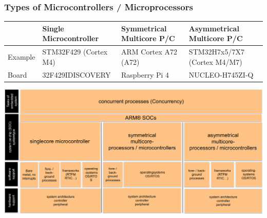 \subsubsection{Types of Microcontrollers / Microprocessors}
\begin{tabularx}{\textwidth}{l X X X}\hline
          & Single Microcontroller & Symmetrical Multicore \textmu{}P/\textmu{}C & Asymmetrical Multicore \textmu{}P/\textmu{}C \\\hline
  Example & STM32F429 (Cortex M4)  & ARM Cortex A72 (A72)                        & STM32H7x5/7X7 \linebreak(Cortex M4/M7)       \\
  Board   & 32F429IDISCOVERY       & Raspberry Pi 4                              & NUCLEO-H745ZI-Q                              \\\hline
\end{tabularx}

\includegraphics[width=\textwidth]{images/RTSystems/emb_landscape.png}

